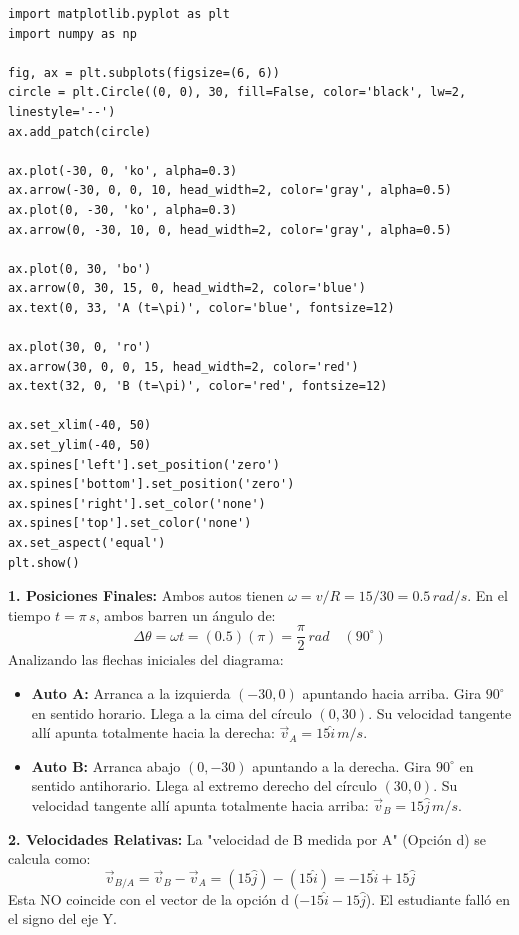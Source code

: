 \documentclass[12pt, a4paper]{article}
\begin{document}
\begin{verbatim}
import matplotlib.pyplot as plt
import numpy as np

fig, ax = plt.subplots(figsize=(6, 6))
circle = plt.Circle((0, 0), 30, fill=False, color='black', lw=2, linestyle='--')
ax.add_patch(circle)

ax.plot(-30, 0, 'ko', alpha=0.3)
ax.arrow(-30, 0, 0, 10, head_width=2, color='gray', alpha=0.5)
ax.plot(0, -30, 'ko', alpha=0.3)
ax.arrow(0, -30, 10, 0, head_width=2, color='gray', alpha=0.5)

ax.plot(0, 30, 'bo')
ax.arrow(0, 30, 15, 0, head_width=2, color='blue')
ax.text(0, 33, 'A (t=\pi)', color='blue', fontsize=12)

ax.plot(30, 0, 'ro')
ax.arrow(30, 0, 0, 15, head_width=2, color='red')
ax.text(32, 0, 'B (t=\pi)', color='red', fontsize=12)

ax.set_xlim(-40, 50)
ax.set_ylim(-40, 50)
ax.spines['left'].set_position('zero')
ax.spines['bottom'].set_position('zero')
ax.spines['right'].set_color('none')
ax.spines['top'].set_color('none')
ax.set_aspect('equal')
plt.show()
\end{verbatim}

\textbf{1. Posiciones Finales:}
Ambos autos tienen $\omega = v/R = 15/30 = 0.5\,\si{rad/s}$.
En el tiempo $t = \pi\,\si{s}$, ambos barren un ángulo de:
$$ \Delta\theta = \omega t = (0.5)(\pi) = \frac{\pi}{2}\,\si{rad} \quad (90^\circ) $$
Analizando las flechas iniciales del diagrama:
\begin{itemize}
    \item \textbf{Auto A:} Arranca a la izquierda $(-30,0)$ apuntando hacia arriba. Gira $90^\circ$ en sentido horario. Llega a la cima del círculo $(0,30)$. Su velocidad tangente allí apunta totalmente hacia la derecha: $\vec{v}_A = 15\hat{i}\,\si{m/s}$.
    \item \textbf{Auto B:} Arranca abajo $(0,-30)$ apuntando a la derecha. Gira $90^\circ$ en sentido antihorario. Llega al extremo derecho del círculo $(30,0)$. Su velocidad tangente allí apunta totalmente hacia arriba: $\vec{v}_B = 15\hat{j}\,\si{m/s}$.
\end{itemize}

\textbf{2. Velocidades Relativas:}
La "velocidad de B medida por A" (Opción d) se calcula como:
$$ \vec{v}_{B/A} = \vec{v}_B - \vec{v}_A = (15\hat{j}) - (15\hat{i}) = -15\hat{i} + 15\hat{j} $$
Esta NO coincide con el vector de la opción d ($-15\hat{i} - 15\hat{j}$). El estudiante falló en el signo del eje Y.
\end{document}
